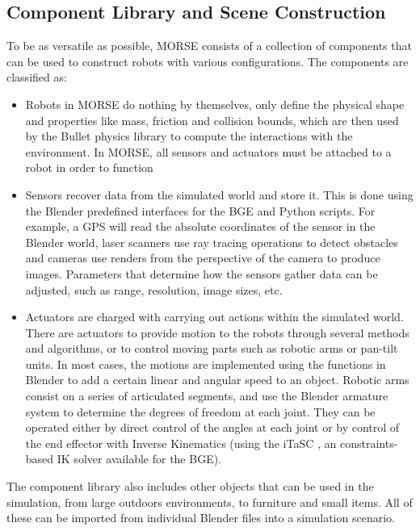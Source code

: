 \documentclass{llncs}
\begin{document}
\subsection{Component Library and Scene Construction}
\label{section:components}

To be as versatile as possible, MORSE consists of a collection of components
that can be used to construct robots with various configurations. The
components are classified as:

\begin{itemize}
  \item Robots in MORSE do nothing by themselves, only define the physical
    shape and properties like mass, friction and collision bounds, which are
    then used by the Bullet physics library to compute the interactions with the
    environment.
    In MORSE, all sensors and actuators must be attached to a robot in order to
    function
  \item Sensors recover data from the simulated world and store it. This is
    done using the Blender predefined interfaces for the BGE and Python scripts.
    For example, a GPS will read the absolute coordinates of the sensor in the
    Blender world, laser scanners use ray tracing operations to detect
    obstacles and cameras use renders from the perspective of the camera to
    produce images. Parameters that determine how the sensors gather data can
    be adjusted, such as range, resolution, image sizes, etc.
  \item Actuators are charged with carrying out actions within the simulated
    world. There are actuators to provide motion to the robots through several
    methods and algorithms, or to control moving parts such as robotic arms or
    pan-tilt units. In most cases, the motions are implemented using the
    functions in Blender to add a certain linear and angular speed to an
    object.
    Robotic arms consist on a series of articulated segments, and use the
    Blender armature system to determine the degrees of freedom at each joint.
    They can be operated either by direct control of the angles at each joint
    or by control of the end effector with Inverse Kinematics (using the iTaSC
    \cite{iTaSC}, an constraints-based IK solver available for the BGE).
\end{itemize}

The component library also includes other objects that can be used in the
simulation, from large outdoors environments, to furniture and small items.
All of these can be imported from individual Blender files into a simulation
scenario.
\end{document}
